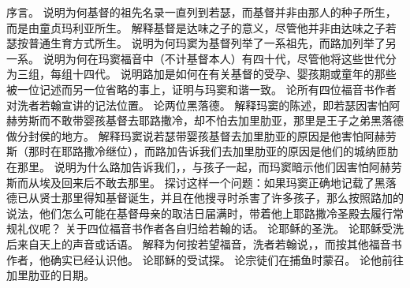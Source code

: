 \par

 序言。\newline{} 说明为何基督的祖先名录一直列到若瑟，而基督并非由那人的种子所生，而是由童贞玛利亚所生。\newline{} 解释基督是达味之子的意义，尽管他并非由达味之子若瑟按普通生育方式所生。\newline{} 说明为何玛窦为基督列举了一系祖先，而路加列举了另一系。\newline{} 说明为何在玛窦福音中（不计基督本人）有四十代，尽管他将这些世代分为三组，每组十四代。\newline{} 说明路加是如何在有关基督的受孕、婴孩期或童年的那些被一位记述而另一位省略的事上，证明与玛窦和谐一致。\newline{} 论所有四位福音书作者对洗者若翰宣讲的记法位置。\newline{} 论两位黑落德。\newline{} 解释玛窦的陈述，即若瑟因害怕阿赫劳斯而不敢带婴孩基督去耶路撒冷，却不怕去加里肋亚，那里是王子之弟黑落德做分封侯的地方。\newline{} 解释玛窦说若瑟带婴孩基督去加里肋亚的原因是他害怕阿赫劳斯（那时在耶路撒冷继位），而路加告诉我们去加里肋亚的原因是他们的城纳匝肋在那里。\newline{} 说明为什么路加告诉我们，，与孩子一起，而玛窦暗示他们因害怕阿赫劳斯而从埃及回来后不敢去那里。\newline{} 探讨这样一个问题：如果玛窦正确地记载了黑落德已从贤士那里得知基督诞生，并且在他搜寻时杀害了许多孩子，那么按照路加的说法，他们怎么可能在基督母亲的取洁日届满时，带着他上耶路撒冷圣殿去履行常规礼仪呢？\newline{} 关于四位福音书作者各自归给若翰的话。\newline{} 论耶稣的圣洗。\newline{} 论耶稣受洗后来自天上的声音或话语。\newline{} 解释为何按若望福音，洗者若翰说，，而按其他福音书作者，他确实已经认识他。\newline{} 论耶稣的受试探。\newline{} 论宗徒们在捕鱼时蒙召。\newline{} 论他前往加里肋亚的日期。\newline{} 